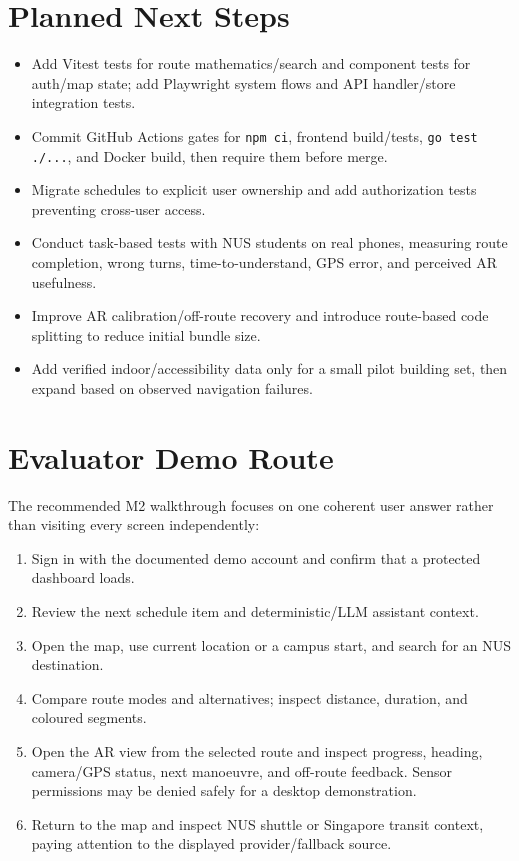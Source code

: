 \documentclass[11pt]{article}
\begin{document}
\section*{Planned Next Steps}

\begin{itemize}[leftmargin=*]
    \item Add Vitest tests for route mathematics/search and component tests for auth/map state; add Playwright system flows and API handler/store integration tests.
    \item Commit GitHub Actions gates for \texttt{npm ci}, frontend build/tests, \texttt{go test ./...}, and Docker build, then require them before merge.
    \item Migrate schedules to explicit user ownership and add authorization tests preventing cross-user access.
    \item Conduct task-based tests with NUS students on real phones, measuring route completion, wrong turns, time-to-understand, GPS error, and perceived AR usefulness.
    \item Improve AR calibration/off-route recovery and introduce route-based code splitting to reduce initial bundle size.
    \item Add verified indoor/accessibility data only for a small pilot building set, then expand based on observed navigation failures.
\end{itemize}

\section*{Evaluator Demo Route}

The recommended M2 walkthrough focuses on one coherent user answer rather than visiting every screen independently:

\begin{enumerate}[leftmargin=*]
    \item Sign in with the documented demo account and confirm that a protected dashboard loads.
    \item Review the next schedule item and deterministic/LLM assistant context.
    \item Open the map, use current location or a campus start, and search for an NUS destination.
    \item Compare route modes and alternatives; inspect distance, duration, and coloured segments.
    \item Open the AR view from the selected route and inspect progress, heading, camera/GPS status, next manoeuvre, and off-route feedback. Sensor permissions may be denied safely for a desktop demonstration.
    \item Return to the map and inspect NUS shuttle or Singapore transit context, paying attention to the displayed provider/fallback source.
\end{enumerate}
\end{document}
